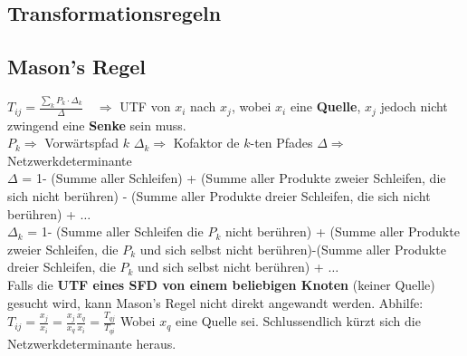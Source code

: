 \subsection{Transformationsregeln }

\subsection{Mason's Regel }
$\boxed{T_{ij} = \frac{\sum\limits_k P_k\cdot\Delta_k}{\Delta}}\quad
\Rightarrow$ UTF von $x_i$ nach $x_j$, wobei \textbf{$x_i$} eine
\textbf{Quelle}, \textbf{$x_j$} jedoch nicht zwingend eine \textbf{Senke} sein
muss. \vspace{0.3cm}\\
$P_k \Rightarrow$ Vorwärtspfad $k$ \qquad $\Delta_k \Rightarrow$ Kofaktor de
$k$-ten Pfades \qquad $\Delta \Rightarrow$ Netzwerkdeterminante\vspace{0.3cm}\\
$\Delta$ = 1- (Summe aller Schleifen) + (Summe aller Produkte zweier
Schleifen, die sich nicht berühren) - (Summe
aller Produkte dreier Schleifen, die sich nicht berühren) + $\ldots$
\vspace{0.3cm}\\
$\Delta_k$ = 1- (Summe aller Schleifen die $P_k$ nicht berühren) + (Summe
aller Produkte zweier Schleifen, die $P_k$ und sich selbst nicht
berühren)-(Summe aller Produkte dreier Schleifen, die $P_k$ und sich selbst
nicht berühren) + $\ldots$ \\

Falls die \textbf{UTF eines SFD von einem beliebigen Knoten} (keiner Quelle)
gesucht wird, kann Mason's Regel nicht direkt angewandt werden. Abhilfe: \\
$T_{ij} = \frac{x_j}{x_i} = \frac{x_j}{x_q} \frac{x_q}{x_i} =
\frac{T_{qj}}{T_{qi}}$ Wobei $x_q$ eine Quelle sei. 
Schlussendlich kürzt sich die Netzwerkdeterminante heraus.


